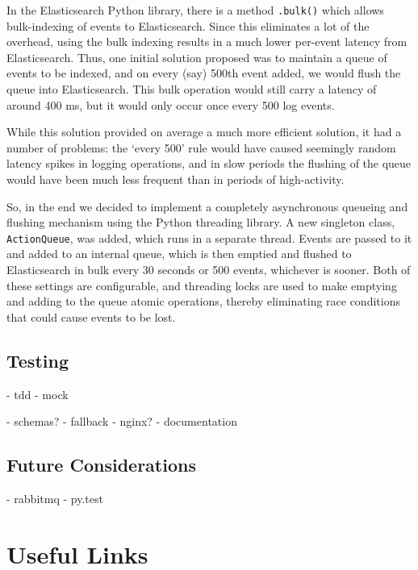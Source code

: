 \documentclass[a4paper,11pt]{article} %
\begin{document}
In the Elasticsearch Python library, there is a method \texttt{.bulk()} which
allows bulk-indexing of events to Elasticsearch.  Since this eliminates a lot
of the overhead, using the bulk indexing results in a much lower per-event
latency from Elasticsearch.  Thus, one initial solution proposed was to
maintain a queue of events to be indexed, and on every (say) 500th event added,
we would flush the queue into Elasticsearch.  This bulk operation would still
carry a latency of around 400 ms, but it would only occur once every 500 log
events.

While this solution provided on average a much more efficient solution, it had
a number of problems: the `every 500' rule would have caused seemingly random
latency spikes in logging operations, and in slow periods the flushing of the
queue would have been much less frequent than in periods of high-activity.

So, in the end we decided to implement a completely asynchronous queueing and
flushing mechanism using the Python threading library.  A new singleton class,
\texttt{ActionQueue}, was added, which runs in a separate thread.  Events are
passed to it and added to an internal queue, which is then emptied and flushed
to Elasticsearch in bulk every 30 seconds or 500 events, whichever is sooner.
Both of these settings are configurable, and threading locks are used to make
emptying and adding to the queue atomic operations, thereby eliminating race
conditions that could cause events to be lost.



\subsection{Testing}
\label{sec:implementation.tdd}


- tdd
- mock

- schemas?
- fallback
- nginx?
- documentation

\subsection{Future Considerations}
\label{sec:future}
- rabbitmq
- py.test

\section{Useful Links}
\label{sec:references}
\end{document}
